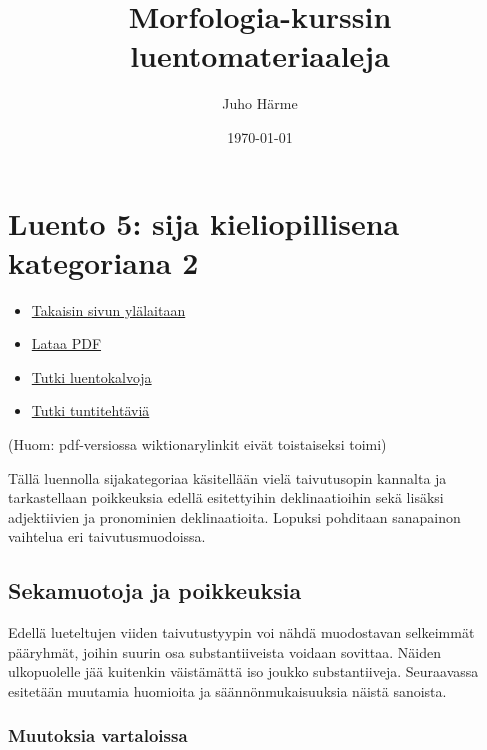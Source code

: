 \documentclass[]{scrartcl}
\author{Juho Härme}
\title{Morfologia-kurssin luentomateriaaleja}
\date{\today}
\providecommand{\tightlist}{%
  \setlength{\itemsep}{0pt}\setlength{\parskip}{0pt}}
\begin{document}
\maketitle
\tableofcontents
\newpage



\section{Luento 5: sija kieliopillisena kategoriana
2}\label{luento-5-sija-kieliopillisena-kategoriana-2}

\begin{itemize}
\tightlist
\item
  \href{https://mustikka.uta.fi/~juho_harme/morfologia/\#tästä-kurssista}{Takaisin
  sivun ylälaitaan}
\item
  \href{http://mustikka.uta.fi/~juho_harme/morfologia/materiaalit/luento5.pdf}{Lataa
  PDF}
\item
  \href{http://mustikka.uta.fi/~juho_harme/morfologia/presentations/luento5.html}{Tutki
  luentokalvoja}
\item
  \href{http://mustikka.uta.fi/~juho_harme/morfologia/tehtavat/luento5.pdf}{Tutki
  tuntitehtäviä}
\end{itemize}

(Huom: pdf-versiossa wiktionarylinkit eivät toistaiseksi toimi)

Tällä luennolla sijakategoriaa käsitellään vielä taivutusopin kannalta
ja tarkastellaan poikkeuksia edellä esitettyihin deklinaatioihin sekä
lisäksi adjektiivien ja pronominien deklinaatioita. Lopuksi pohditaan
sanapainon vaihtelua eri taivutusmuodoissa.

\subsection{Sekamuotoja ja
poikkeuksia}\label{sekamuotoja-ja-poikkeuksia}

Edellä lueteltujen viiden taivutustyypin voi nähdä muodostavan
selkeimmät pääryhmät, joihin suurin osa substantiiveista voidaan
sovittaa. Näiden ulkopuolelle jää kuitenkin väistämättä iso joukko
substantiiveja. Seuraavassa esitetään muutamia huomioita ja
säännönmukaisuuksia näistä sanoista.

\subsubsection{Muutoksia vartaloissa}\label{muutoksia-vartaloissa}
\end{document}
